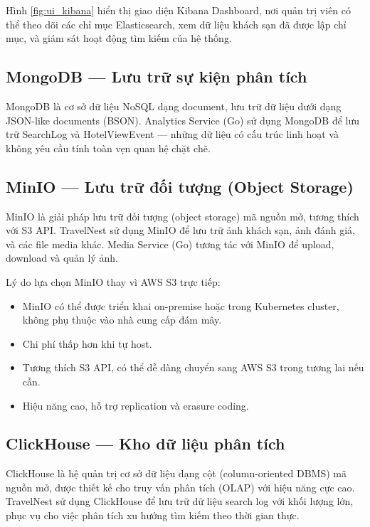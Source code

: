 \documentclass[13pt,a4paper,twoside]{report}
\begin{document}
Hình \ref{fig:ui_kibana} hiển thị giao diện Kibana Dashboard, nơi quản trị viên có thể theo dõi các chỉ mục Elasticsearch, xem dữ liệu khách sạn đã được lập chỉ mục, và giám sát hoạt động tìm kiếm của hệ thống.

\subsection{MongoDB --- Lưu trữ sự kiện phân tích}

MongoDB là cơ sở dữ liệu NoSQL dạng document, lưu trữ dữ liệu dưới dạng JSON-like documents (BSON). Analytics Service (Go) sử dụng MongoDB để lưu trữ SearchLog và HotelViewEvent --- những dữ liệu có cấu trúc linh hoạt và không yêu cầu tính toàn vẹn quan hệ chặt chẽ.

\subsection{MinIO --- Lưu trữ đối tượng (Object Storage)}

MinIO là giải pháp lưu trữ đối tượng (object storage) mã nguồn mở, tương thích với S3 API. TravelNest sử dụng MinIO để lưu trữ ảnh khách sạn, ảnh đánh giá, và các file media khác. Media Service (Go) tương tác với MinIO để upload, download và quản lý ảnh.

Lý do lựa chọn MinIO thay vì AWS S3 trực tiếp:

\begin{itemize}
  \item MinIO có thể được triển khai on-premise hoặc trong Kubernetes cluster, không phụ thuộc vào nhà cung cấp đám mây.
  \item Chi phí thấp hơn khi tự host.
  \item Tương thích S3 API, có thể dễ dàng chuyển sang AWS S3 trong tương lai nếu cần.
  \item Hiệu năng cao, hỗ trợ replication và erasure coding.
\end{itemize}

\subsection{ClickHouse --- Kho dữ liệu phân tích}

ClickHouse là hệ quản trị cơ sở dữ liệu dạng cột (column-oriented DBMS) mã nguồn mở, được thiết kế cho truy vấn phân tích (OLAP) với hiệu năng cực cao. TravelNest sử dụng ClickHouse để lưu trữ dữ liệu search log với khối lượng lớn, phục vụ cho việc phân tích xu hướng tìm kiếm theo thời gian thực.
\end{document}
